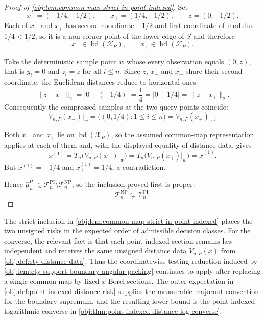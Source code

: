 \documentclass[11pt]{article}
\begin{document}
\begin{proof}[Proof of \cref{obj:lem:common-map-strict-in-point-indexed}]
Set
\[
x_-=(-1/4,-1/2),\qquad x_+=(1/4,-1/2),\qquad z=(0,-1/2).
\]
Each of \(x_-\) and \(x_+\) has second coordinate \(-1/2\) and first coordinate of modulus \(1/4<1/2\), so it is a non-corner point of the lower edge of \(S\) and therefore
\[
x_-\in\operatorname{bd}(\mathcal X_P),
\qquad
x_+\in\operatorname{bd}(\mathcal X_P).
\]

Take the deterministic sample point \(w\) whose every observation equals \((0,z)\), that is \(y_i=0\) and \(z_i=z\) for all \(i\leq n\).  Since \(z\), \(x_-\) and \(x_+\) share their second coordinate, the Euclidean distances reduce to horizontal ones:
\[
\lVert z-x_-\rVert_2=\left|0-(-1/4)\right|=\frac14=\left|0-1/4\right|=\lVert z-x_+\rVert_2 .
\]
Consequently the compressed samples at the two query points coincide:
\[
V_{n,P}(x_-)\big|_{w}
=
\bigl((0,1/4):1\leq i\leq n\bigr)
=
V_{n,P}(x_+)\big|_{w}.
\]

Both \(x_-\) and \(x_+\) lie on \(\operatorname{bd}(\mathcal X_P)\), so the assumed common-map representation applies at each of them and, with the displayed equality of distance data, gives
\[
x_-^{(1)}
=
T_n\bigl(V_{n,P}(x_-)\big|_{w}\bigr)
=
T_n\bigl(V_{n,P}(x_+)\big|_{w}\bigr)
=
x_+^{(1)} .
\]
But \(x_-^{(1)}=-1/4\) and \(x_+^{(1)}=1/4\), a contradiction.

Hence \(\widehat\mu_n^{\mathrm{PI}}\in\mathcal T_n^{\mathrm{PI}}\setminus\mathcal T_n^{\mathrm{NP}}\), so the inclusion proved first is proper:
\[
\mathcal T_n^{\mathrm{NP}}\subsetneq\mathcal T_n^{\mathrm{PI}} .
\]
\end{proof}

The strict inclusion in \cref{obj:lem:common-map-strict-in-point-indexed} places the two unsigned risks in the expected order of admissible decision classes. For the converse, the relevant fact is that each point-indexed section remains law independent and receives the same unsigned distance data \(V_{n,P}(x)\) from \cref{obj:def:cty-distance-data}. Thus the coordinatewise testing reduction induced by \cref{obj:lem:cty-support-boundary-angular-packing} continues to apply after replacing a single common map by fixed-\(x\) Borel sections. The outer expectation in \cref{obj:def:point-indexed-distance-risk} supplies the measurable-majorant convention for the boundary supremum, and the resulting lower bound is the point-indexed logarithmic converse in \cref{obj:thm:point-indexed-distance-log-converse}.
\end{document}
